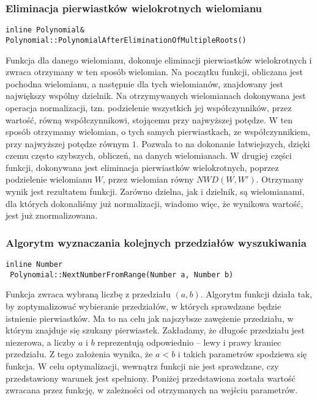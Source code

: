 \subsubsection{Eliminacja pierwiastków wielokrotnych wielomianu}
\begin{lstlisting}
inline Polynomial&
Polynomial::PolynomialAfterEliminationOfMultipleRoots()
\end{lstlisting}

Funkcja dla danego wielomianu, dokonuje eliminacji pierwiastków wielokrotnych i zwraca otrzymany w ten sposób wielomian. Na początku funkcji, obliczana jest pochodna wielomianu, a następnie dla tych wielomianów, znajdowany jest największy wspólny dzielnik. Na otrzymywanych wielomianach dokonywana jest operacja normalizacji, tzn. podzielenie wszystkich jej współczynników, przez wartość, równą współczynnikowi, stojącemu przy najwyższej potędze. W ten sposób otrzymamy wielomian, o tych samych pierwiastkach, ze współczynnikiem, przy najwyższej potędze równym $1$. Pozwala to na dokonanie łatwiejszych, dzięki czemu często szybszych, obliczeń, na danych wielomianach. W drugiej części funkcji, dokonywana jest eliminacja pierwiastków wielokrotnych, poprzez podzielenie wielomianu $W$, przez wielomian równy $NWD(W, W')$. Otrzymany wynik jest rezultatem funkcji. Zarówno dzielna, jak i dzielnik, są wielomianami, dla których dokonaliśmy już normalizacji, wiadomo więc, że wynikowa wartość, jest już znormalizowana.

\subsubsection{Algorytm wyznaczania kolejnych przedziałów wyszukiwania}
\begin{lstlisting}
inline Number
 Polynomial::NextNumberFromRange(Number a, Number b)
\end{lstlisting}

Funkcja zwraca wybraną liczbę z przedziału $(a,b)$. Algorytm funkcji działa tak, by zoptymalizować wybieranie przedziałów, w których sprawdzane będzie istnienie pierwiastków. Ma to na celu jak najszybsze zawężenie przedziału, w którym znajduje się szukany pierwiastek. Zakładamy, że długośc przedziału jest niezerowa, a liczby $a$ i $b$ reprezentują odpowiednio -- lewy i prawy kraniec przedziału. Z tego założenia wynika, że $a<b$ i takich parametrów spodziewa się funkcja. W celu optymalizacji, wewnątrz funkcji nie jest sprawdzane, czy przedstawiony warunek jest spełniony. Poniżej przedstawiona została wartość zwracana przez funkcję, w zależności od otrzymanych na wejściu parametrów.

